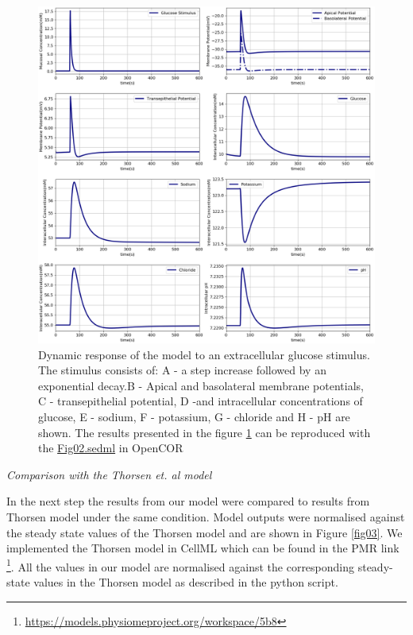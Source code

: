 \documentclass[fleqn,10pt]{physiome}
\begin{document}
\begin{figure}[ht]
\centering
\includegraphics[width=0.8\linewidth]{fig02.png}
\caption{Dynamic response of the model to an extracellular
glucose stimulus. The stimulus consists of: A - a step increase
followed by an exponential decay.B - Apical and basolateral
membrane potentials, C - transepithelial potential, D -and intracellular
concentrations of glucose, E - sodium, F - potassium, G - chloride and H - pH are shown. The results presented in the figure \ref{fig02} can be reproduced with the \href{https://models.physiomeproject.org/workspace/572/file/59488c15178b09bcb5b11f795383b1435f7b7ef1/SEDML_files/Fig02.sedml}{Fig02.sedml} in OpenCOR}
\label{fig02}
\end{figure}

\textit{Comparison with the Thorsen et. al model \citep{thorsen2014transepithelial}}\newline

In the next step the results from our model were compared to results from Thorsen model under the same condition. Model outputs were normalised against the steady state values of the Thorsen model and are shown in Figure \ref{fig03}. We implemented the Thorsen model in CellML which can be found in the PMR link \footnote{\url{https://models.physiomeproject.org/workspace/5b8}}. All the values in our model are normalised against the corresponding steady-state values in the Thorsen model as described in the python script. \newpage
\end{document}
